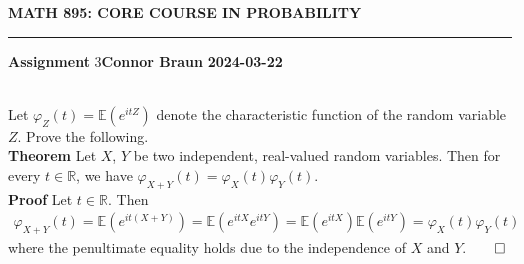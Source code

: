 \documentclass[10pt]{article}
\newcommand{\E}{\mathbb{E}}
\newcommand{\mbb}[1]{\mathbb{#1}}
\newcommand{\1}[1]{\mathbbm{1}_{#1}}
\begin{document}
    \begin{center}
        {\bf\large{MATH 895: CORE COURSE IN PROBABILITY}}
        \smallskip
        \hrule
        \smallskip
        {\bf Assignment} 3\hfill {\bf Connor Braun} \hfill {\bf 2024-03-22}
    \end{center}
    \\[5pt]
    Let $\varphi_Z(t)=\E{(e^{itZ})}$ denote the characteristic function of the random variable $Z$. Prove the following.\\[5pt]
    {\bf Theorem}\hspace{5pt} Let $X$, $Y$ be two independent, real-valued random variables. Then for every $t\in\mbb{R}$, we have $\varphi_{X+Y}(t)=\varphi_X(t)\varphi_Y(t)$.\\[5pt]
    {\bf Proof}\hspace{5pt} Let $t\in\mbb{R}$. Then
    \begin{align*}
        \varphi_{X+Y}(t)=\E{(e^{it(X+Y)})}=\E{(e^{itX}e^{itY})}=\E{(e^{itX})}\E{(e^{itY})}=\varphi_X(t)\varphi_Y(t)
    \end{align*}
    where the penultimate equality holds due to the independence of $X$ and $Y$.\hfill{$\qed$}\\[5pt]
\end{document}
